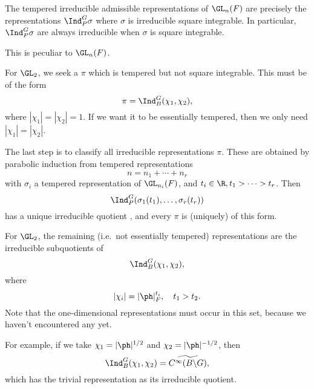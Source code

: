 \documentclass[a4paper]{article}
\begin{document}
\begin{thm}
  The tempered irreducible admissible representations of $\GL_n(F)$ are precisely the representations $\Ind_P^G \sigma$ where $\sigma$ is irreducible square integrable. In particular, $\Ind_P^G \sigma$ are always irreducible when $\sigma$ is square integrable.
\end{thm}
This is peculiar to $\GL_n(F)$.

\begin{eg}
  For $\GL_2$, we seek a $\pi$ which is tempered but not square integrable. This must be of the form
  \[
    \pi = \Ind_B^G (\chi_1, \chi_2),
  \]
  where $|\chi_1| = |\chi_2| = 1$. If we want it to be essentially tempered, then we only need $|\chi_1| = |\chi_2|$.
\end{eg}

The last step is to classify all irreducible representations $\pi$. These are obtained by parabolic induction from tempered representations
\[
  n = n_1 + \cdots + n_r
\]
with $\sigma_i$ a tempered representation of $\GL_{n_i}(F)$, and $t_i \in \R, t_1 > \cdots > t_r$. Then
\[
  \Ind_P^G(\sigma_1(t_1), \ldots, \sigma_r(t_r))
\]
has a unique irreducible quotient , and every $\pi$ is (uniquely) of this form.

\begin{eg}
  For $\GL_2$, the remaining (i.e.\ not essentially tempered) representations are the irreducible subquotients of
  \[
    \Ind_B^G (\chi_1, \chi_2),
  \]
  where
  \[
    |\chi_i| = |\ph |_F^{t_i},\quad t_1 > t_2.
  \]
  Note that the one-dimensional representations must occur in this set, because we haven't encountered any yet.

  For example, if we take $\chi_1 = |\ph|^{1/2}$ and $\chi_2 = |\ph|^{-1/2}$, then
  \[
    \Ind_B^G(\chi_1, \chi_2) = \widetilde{C^\infty(B \backslash G)},
  \]
  which has the trivial representation as its irreducible quotient.
\end{eg}
\end{document}
